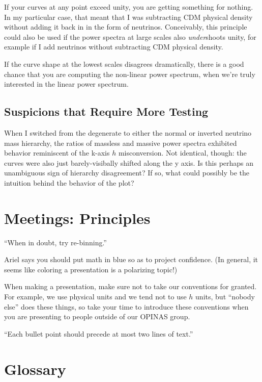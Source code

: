 \documentclass[11pt]{article}
\begin{document}
        If your curves at any point exceed unity, you are getting something for
        nothing. In my particular case, that  meant that I was subtracting CDM
        physical density without adding it back in in the form of neutrinos.
        Conceivably, this principle could also be used if the power spectra at
        large scales also \textit{under}shoots unity, for example if I add
        neutrinos without subtracting CDM physical density.

        If the curve shape at the lowest scales disagrees dramatically, there
        is a good chance that you are computing the non-linear power spectrum,
        when we're truly interested in the linear power spectrum.

    \subsection{Suspicions that Require More Testing}

        When I switched from the degenerate to either the normal or inverted
        neutrino mass hierarchy, the ratios of massless and massive power
        spectra exhibited behavior reminiscent of the k-axis $h$ misconversion.
        Not identical, though: the curves were also just barely-visibally
        shifted along the y axis. Is this perhaps an unambiguous sign of
        hierarchy disagreement? If so, what could possibly be the intuition
        behind the behavior of the plot?


\section{Meetings: Principles}

``When in doubt, try re-binning.''

Ariel says you should put math in blue so as to project confidence. (In
general, it seems like coloring a presentation is a polarizing topic!)

When making a presentation, make sure not to take our conventions for granted.
For example, we use physical units and we tend not to use $h$ units, but
``nobody else'' does these things, so take your time to introduce these
conventions when you are presenting to people outside of our OPINAS group.

``Each bullet point should precede at most two lines of text.''

\section{Glossary}
\end{document}

